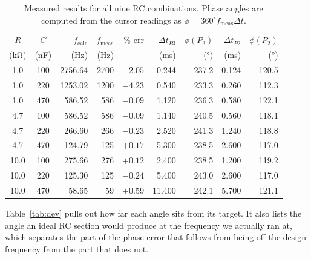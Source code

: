 \documentclass[11pt]{article}
\begin{document}
\begin{table}[H]
    \centering
    \small
    \caption{Measured results for all nine RC combinations. Phase angles are
    computed from the cursor readings as $\phi = 360^{\circ} f_{\text{meas}}\Delta t$.}
    \label{tab:results}
    \begin{tabular}{cc rr r rr rr}
        \toprule
        $R$ & $C$ &
        $f_{\text{calc}}$ & $f_{\text{meas}}$ & \% err &
        $\Delta t_{P3}$ & $\phi(P_3)$ &
        $\Delta t_{P2}$ & $\phi(P_2)$ \\
        (\unit{\kilo\ohm}) & (\unit{\nano\farad}) &
        (\unit{\hertz}) & (\unit{\hertz}) & &
        (\unit{\milli\second}) & (\unit{\degree}) &
        (\unit{\milli\second}) & (\unit{\degree}) \\
        \midrule
        1.0  & 100 & 2756.64 & 2700 & $-2.05$ & 0.244 & 237.2 & 0.124 & 120.5 \\
        1.0  & 220 & 1253.02 & 1200 & $-4.23$ & 0.540 & 233.3 & 0.260 & 112.3 \\
        1.0  & 470 &  586.52 &  586 & $-0.09$ & 1.120 & 236.3 & 0.580 & 122.1 \\
        4.7  & 100 &  586.52 &  586 & $-0.09$ & 1.140 & 240.5 & 0.560 & 118.1 \\
        4.7  & 220 &  266.60 &  266 & $-0.23$ & 2.520 & 241.3 & 1.240 & 118.8 \\
        4.7  & 470 &  124.79 &  125 & $+0.17$ & 5.300 & 238.5 & 2.600 & 117.0 \\
        10.0 & 100 &  275.66 &  276 & $+0.12$ & 2.400 & 238.5 & 1.200 & 119.2 \\
        10.0 & 220 &  125.30 &  125 & $-0.24$ & 5.400 & 243.0 & 2.600 & 117.0 \\
        10.0 & 470 &   58.65 &   59 & $+0.59$ & 11.400 & 242.1 & 5.700 & 121.1 \\
        \bottomrule
    \end{tabular}
\end{table}

Table~\ref{tab:dev} pulls out how far each angle sits from its target. It also
lists the angle an ideal RC section would produce at the frequency we actually
ran at, which separates the part of the phase error that follows from being off
the design frequency from the part that does not.
\end{document}

